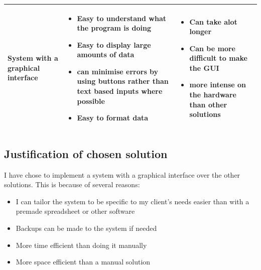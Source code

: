 \begin{center}
\begin{tabular}{|l|p{4.5cm}|p{4.5cm}|}
	System with a graphical interface & \begin{itemize} \item Easy to understand what the program is doing \item Easy to display large amounts of data \item can minimise errors by using buttons rather than text based inputs where possible \item Easy to format data \end{itemize} & \begin{itemize} \item Can take alot longer \item Can be more difficult to make the GUI \item more intense on the hardware than other solutions \end{itemize}\\ \hline
\end{tabular}
\end{center}
\subsection{Justification of chosen solution}
I have chose to implement a system with a graphical interface over the other solutions. This is because of several reasons:
\begin{itemize}
	\item I can tailor the system to be specific to my client's needs easier than with a premade spreadsheet or other software
	\item Backups can be made to the system if needed
	\item More time efficient than doing it manually
	\item More space efficient than a manual solution
\end{itemize}